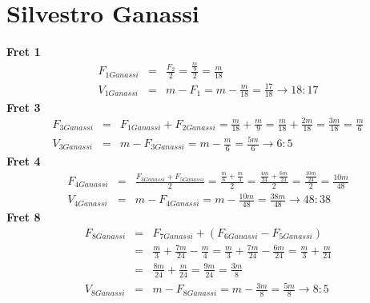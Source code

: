 \section{Silvestro Ganassi}

\textbf{Fret 1}
\begin{eqnarray*}
    F_{1Ganassi}
        &=& \frac{F_2}{2}
        = \frac{\frac{m}{9}}{2}
        = \frac{m}{18} \\
    V_{1Ganassi}
        &=& m - F_1
        = m - \frac{m}{18}
        = \frac{17}{18}
        \to 18:17
\end{eqnarray*}
\textbf{Fret 3}
\begin{eqnarray*}
    F_{3Ganassi}
        &=& F_{1Ganassi} + F_{2Ganassi}
        = \frac{m}{18} + \frac{m}{9}
        = \frac{m}{18} + \frac{2m}{18}
        = \frac{3m}{18}
        = \frac{m}{6} \\
    V_{3Ganassi}
        &=& m - F_{3Ganassi}
        = m - \frac{m}{6}
        = \frac{5m}{6}
        \to 6:5
\end{eqnarray*}
\textbf{Fret 4}
\begin{eqnarray*}
    F_{4Ganassi}
        &=& \frac{F_{3Ganassi} + F_{5Ganassi}}{2}
        = \frac{\frac{m}{6} + \frac{m}{4}}{2}
        = \frac{\frac{4m}{24} + \frac{6m}{24}}{2}
        = \frac{\frac{10m}{24}}{2}
        = \frac{10m}{48} \\
    V_{4Ganassi}
        &=& m - F_{4Ganassi}
        = m - \frac{10m}{48}
        = \frac{38m}{48}
        \to 48:38
\end{eqnarray*}
\textbf{Fret 8}
\begin{eqnarray*}
    F_{8Ganassi}
        &=& F_{7Ganassi} + (F_{6Ganassi} - F_{5Ganassi}) \\
        &=& \frac{m}{3} + \frac{7m}{24} - \frac{m}{4}
        = \frac{m}{3} + \frac{7m}{24} - \frac{6m}{24}
        = \frac{m}{3} + \frac{m}{24} \\
        &=& \frac{8m}{24} + \frac{m}{24}
        = \frac{9m}{24}
        = \frac{3m}{8} \\
    V_{8Ganassi}
        &=& m - F_{8Ganassi}
        = m - \frac{3m}{8}
        = \frac{5m}{8}
        \to 8:5
\end{eqnarray*}